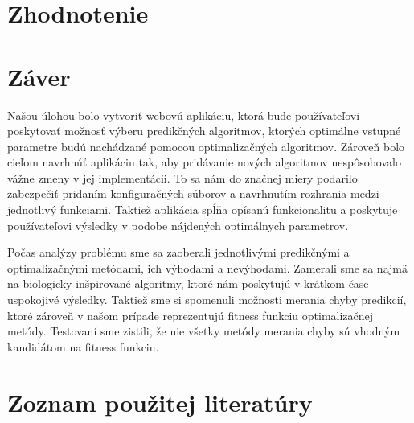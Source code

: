 \documentclass[a4paper,slovak,12pt,appendix]{article}
\begin{document}

\newpage
\section{Zhodnotenie}
\label{evaluation}



\newpage
\section{Záver}
\label{conclusion}
Našou úlohou bolo vytvoriť webovú aplikáciu, ktorá bude používateľovi poskytovať
možnosť výberu predikčných algoritmov, ktorých optimálne vstupné parametre budú
nachádzané pomocou optimalizačných algoritmov. Zároveň bolo cieľom navrhnúť
aplikáciu tak, aby pridávanie nových algoritmov nespôsobovalo vážne zmeny v jej
implementácii. To sa nám do značnej miery podarilo zabezpečiť pridaním
konfiguračných súborov a navrhnutím rozhrania medzi jednotlivý funkciami.
Taktiež aplikácia spĺňa opísanú funkcionalitu a poskytuje používateľovi
výsledky v podobe nájdených optimálnych parametrov.

Počas analýzy problému sme sa zaoberali jednotlivými predikčnými
a optimalizačnými metódami, ich výhodami a nevýhodami. Zamerali sme sa najmä na
biologicky inšpirované algoritmy, ktoré nám poskytujú v krátkom čase uspokojivé
výsledky. Taktiež sme si spomenuli možnosti merania chyby predikcií, ktoré
zároveň v našom prípade reprezentujú fitness funkciu optimalizačnej metódy.
Testovaní sme zistili, že nie všetky metódy merania chyby sú vhodným kandidátom
na fitness funkciu.


\newpage
\section{Zoznam použitej literatúry}
\begingroup
\renewcommand{\section}[2]{}


\endgroup
\end{document}
